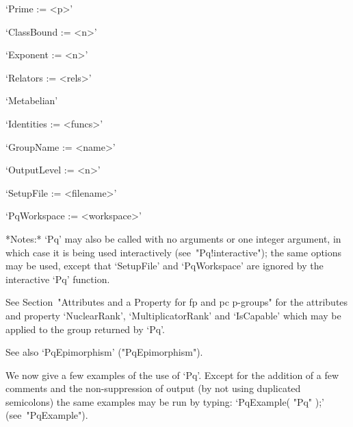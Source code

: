 \beginlist%

\item{}`Prime := <p>'

\item{}`ClassBound := <n>'

\item{}`Exponent := <n>'

\item{}`Relators := <rels>'

\item{}`Metabelian'

\item{}`Identities := <funcs>'

\item{}`GroupName := <name>'

\item{}`OutputLevel := <n>'

\item{}`SetupFile := <filename>'

\item{}`PqWorkspace := <workspace>'

\endlist

*Notes:* `Pq' may also  be  called  with  no  arguments  or  one  integer
argument,   in   which   case   it   is    being    used    interactively
(see~"Pq!interactive");  the  same  options  may  be  used,  except  that
`SetupFile'  and  `PqWorkspace'  are  ignored  by  the  interactive  `Pq'
function.

See Section~"Attributes and a Property for fp and pc  p-groups"  for  the
attributes   and   property   `NuclearRank',   `MultiplicatorRank'    and
`IsCapable' which may be applied to the group returned by `Pq'.

See also `PqEpimorphism' ("PqEpimorphism").

We now give a few examples of the use of `Pq'. Except for the addition of
a few comments and the non-suppression of output (by not using duplicated
semicolons) the same examples may be run by typing: `PqExample( "Pq"  );'
(see~"PqExample").

